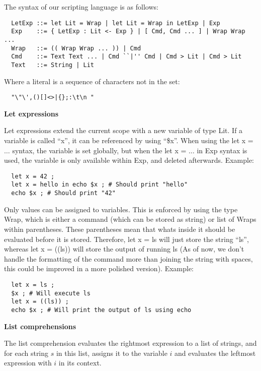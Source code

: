 \documentclass[11pt,a4paper]{article}
\begin{document}
The syntax of our scripting language is as follows:

\begin{verbatim}
  LetExp ::= let Lit = Wrap | let Lit = Wrap in LetExp | Exp
  Exp    ::= { LetExp : Lit <- Exp } | [ Cmd, Cmd ... ] | Wrap Wrap ...
  Wrap   ::= (( Wrap Wrap ... )) | Cmd
  Cmd    ::= Text Text ... | Cmd ``|'' Cmd | Cmd > Lit | Cmd > Lit
  Text   ::= String | Lit
\end{verbatim}

Where a literal is a sequence of characters not in the set:
\begin{verbatim}
  "\"\',()[]<>|{};:\t\n "
\end{verbatim}

\textbf{Let expressions}

Let expressions extend the current scope with a new variable of type Lit. If a
variable is called ``x'', it can be referenced by using ``\$x''.  When using the
let x = $\dots$ syntax, the variable is set globally, but when the let x =
$\dots$ in Exp syntax is used, the variable is only available within Exp, and
deleted afterwards. Example:

\begin{verbatim}
  let x = 42 ;
  let x = hello in echo $x ; # Should print "hello"
  echo $x ; # Should print "42"
\end{verbatim}

Only values can be assigned to variables. This is enforced by using the type
Wrap, which is either a command (which can be stored as string) or list of
Wraps within parentheses. These parentheses mean that whats inside it should be
evaluated before it is stored. Therefore, let x = ls will just store the string
``ls'', whereas let x = ((ls)) will store the output of running ls (As of now,
we don't handle the formatting of the command more than joining the string with
spaces, this could be improved in a more polished version). Example:

\begin{verbatim}
  let x = ls ;
  $x ; # Will execute ls
  let x = ((ls)) ;
  echo $x ; # Will print the output of ls using echo
\end{verbatim}

\textbf{List comprehensions}

The list comprehension evaluates the rightmost expression to a list of strings,
and for each string $s$ in this list, assigns it to the variable $i$ and
evaluates the leftmost expression with $i$ in its context.
\end{document}
